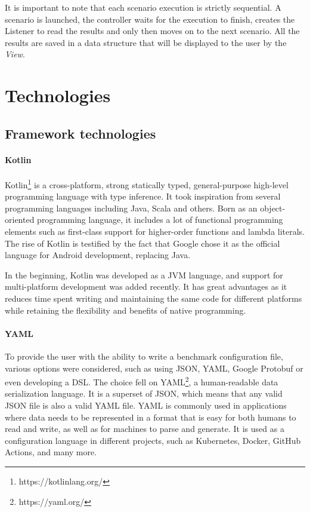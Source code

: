 \documentclass[12pt,a4paper,openright,twoside]{book}
\begin{document}
It is important to note that each scenario execution is strictly sequential. A scenario is launched, the controller waits for the execution to finish, creates the Listener to read the results and only then moves on to the next scenario.
All the results are saved in a data structure that will be displayed to the user by the \emph{View}.

\section{Technologies}

\subsection*{Framework technologies}

\paragraph*{Kotlin}

Kotlin\footnote{https://kotlinlang.org/} is a cross-platform, strong statically typed, general-purpose high-level programming language with type inference.
It took inspiration from several programming languages including Java, Scala and others.
Born as an object-oriented programming language, it includes a lot of functional programming elements such as first-class support for higher-order functions and lambda literals.
The rise of Kotlin is testified by the fact that Google chose it as the official language for Android development, replacing Java.

In the beginning, Kotlin was developed as a JVM language, and support for multi-platform development was added recently. 
It has great advantages as it reduces time spent writing and maintaining the same code for different platforms while retaining the flexibility and benefits of native programming.

\paragraph*{YAML}
To provide the user with the ability to write a benchmark configuration file, various options were considered, such as using JSON, YAML, Google Protobuf or even developing a DSL. 
The choice fell on YAML\footnote{https://yaml.org/}, a human-readable data serialization language. It is a superset of JSON, which means that any valid JSON file is also a valid YAML file.
YAML is commonly used in applications where data needs to be represented in a format that is easy for both humans to read and write, as well as for machines to parse and generate.
It is used as a configuration language in different projects, such as Kubernetes, Docker, GitHub Actions, and many more.
\end{document}
